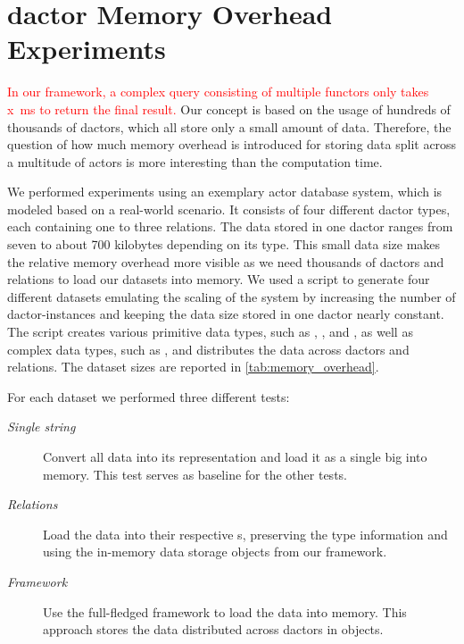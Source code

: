 
\section[Dactor Memory Overhead Experiments]{\Gls{dactor} Memory Overhead Experiments}\label{sec:experiments}

  \textcolor{red}{
  In our framework, a complex query consisting of multiple \glspl{functor} only takes x~ms to return the final result.
  }
  Our concept is based on the usage of hundreds of thousands of \glspl{dactor}, which all store only a small amount of data.
  Therefore, the question of how much memory overhead is introduced for storing data split across a multitude of actors is more interesting than the computation time.

  We performed experiments using an exemplary actor database system, which is modeled based on a real-world scenario.
  It consists of four different \gls{dactor} types, each containing one to three relations.
  The data stored in one \gls{dactor} ranges from seven to about 700 kilobytes depending on its type.
  This small data size makes the relative memory overhead more visible as we need thousands of \glspl{dactor} and relations to load our datasets into memory.
  We used a script to generate four different datasets emulating the scaling of the system by increasing the number of \gls{dactor}-instances and keeping the data size stored in one \gls{dactor} nearly constant.
  The script creates various primitive data types, such as , , and , as well as complex data types, such as , and distributes the data across \glspl{dactor} and relations.
  The dataset sizes are reported in \cref{tab:memory_overhead}.

  For each dataset we performed three different tests:
  \begin{description}
    \item[\textit{Single string}] Convert all data into its  representation and load it as a single big  into memory.
    This test serves as baseline for the other tests.
    \item[\textit{Relations}] Load the data into their respective s, preserving the type information and using the in-memory data storage objects from our framework.
    \item[\textit{Framework}] Use the full-fledged framework to load the data into memory.
    This approach stores the data distributed across \glspl{dactor} in  objects.
  \end{description}

